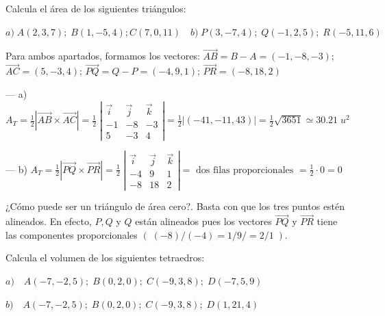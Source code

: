 \begin{ejre}
	Calcula el área de los siguientes triángulos:
	
\noindent \small{$a)\; A(2,3,7); \; B(1,-5,4); C(7,0,11)\quad b)\; P(3,-7,4);\; Q(-1,2,5);\; R(-5,11,6)$}
\end{ejre}

\begin{proofw}\renewcommand{\qedsymbol}{$\diamond$}

Para ambos apartados, formamos los vectores: $\overrightarrow{AB}=B-A=(-1,-8,-3)$;  $\overrightarrow{AC}=(5,-3,4)$;  $\overrightarrow{PQ}=Q-P=(-4, 9, 1)$; $\overrightarrow{PR}=(-8,18,2)$

	\normalsize{--- a)} $A_T=\frac 1 2 |\overrightarrow{AB} \times \overrightarrow{AC} |= \frac 1 2 \; \left|\begin{matrix} \vec i &\vec j & \vec k \\ -1&-8&-3\\5&-3&4\end{matrix} \right|=\frac 1 2 |(-41,-11,43)|=\frac 1 2 \sqrt{3651}\simeq 30.21\; u^2$ 
	
	\noindent \normalsize{--- b)} $A_T=\frac 1 2 |\overrightarrow{PQ} \times \overrightarrow{PR} |= \frac 1 2 \; \left|\begin{matrix} \vec i &\vec j & \vec k \\ -4&9&1\\-8&18&2\end{matrix} \right|=\text{ dos filas proporcionales }=\frac 1 2 \cdot 0=0$ 
	
	\small{\textcolor{gris}{¿Cómo puede ser un triángulo de área cero?. Basta con que los tres puntos estén alineados. En efecto, $P,Q$ y $Q$ están alineados pues los vectores  $\overrightarrow{PQ}$ y  $\overrightarrow{PR}$ tiene las componentes proporcionales $(\; (-8)/(-4)=1/9/=2/1\; )$}}\normalsize{.}
\end{proofw}


\begin{ejre}
	Calcula el volumen de los siguientes tetraedros:
	
	$a)\quad A(-7,-2,5); \; B(0,2,0); \; C(-9,3,8); \; D(-7,5,9)$
	
	$b)\quad A(-7,-2,5); \; B(0,2,0); \; C(-9,3,8); \; D(1,21,4)$
\end{ejre}

